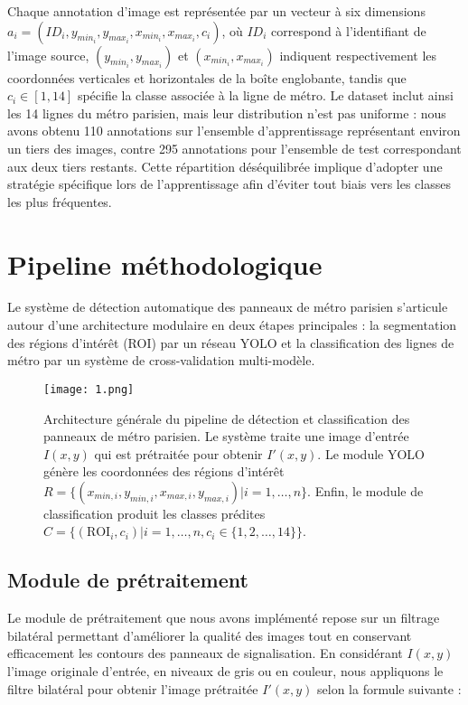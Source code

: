 \documentclass[journal]{IEEEtran}
\begin{document}
Chaque annotation d'image est représentée par un vecteur à six dimensions $a_i = (ID_i, y_{min_i}, y_{max_i}, x_{min_i}, x_{max_i}, c_i)$, où $ID_i$ correspond à l'identifiant de l'image source, $(y_{min_i}, y_{max_i})$ et $(x_{min_i}, x_{max_i})$ indiquent respectivement les coordonnées verticales et horizontales de la boîte englobante, tandis que $c_i \in [1,14]$ spécifie la classe associée à la ligne de métro. Le dataset inclut ainsi les 14 lignes du métro parisien, mais leur distribution n'est pas uniforme : nous avons obtenu 110 annotations sur l'ensemble d'apprentissage représentant environ un tiers des images, contre 295 annotations pour l'ensemble de test correspondant aux deux tiers restants. Cette répartition déséquilibrée implique d'adopter une stratégie spécifique lors de l'apprentissage afin d'éviter tout biais vers les classes les plus fréquentes.

\section{Pipeline méthodologique}

Le système de détection automatique des panneaux de métro parisien s'articule autour d'une architecture modulaire en deux étapes principales : la segmentation des régions d'intérêt (ROI) par un réseau YOLO et la classification des lignes de métro par un système de cross-validation multi-modèle.

\begin{figure}[H]
\begin{center}
\texttt{[image: 1.png]}
\caption{Architecture générale du pipeline de détection et classification des panneaux de métro parisien. Le système traite une image d'entrée $I(x,y)$ qui est prétraitée pour obtenir $I'(x,y)$. Le module YOLO génère les coordonnées des régions d'intérêt $R = \{(x_{min,i}, y_{min,i}, x_{max,i}, y_{max,i}) | i = 1, \ldots, n\}$. Enfin, le module de classification produit les classes prédites $C = \{(\text{ROI}_i, c_i) | i = 1, \ldots, n, c_i \in \{1, 2, \ldots, 14\}\}$.}
\label{fig:pipeline}
\end{center}
\end{figure}

\subsection{Module de prétraitement}

Le module de prétraitement que nous avons implémenté repose sur un filtrage bilatéral permettant d'améliorer la qualité des images tout en conservant efficacement les contours des panneaux de signalisation. En considérant $I(x,y)$ l'image originale d'entrée, en niveaux de gris ou en couleur, nous appliquons le filtre bilatéral pour obtenir l'image prétraitée $I'(x,y)$ selon la formule suivante :
\end{document}
